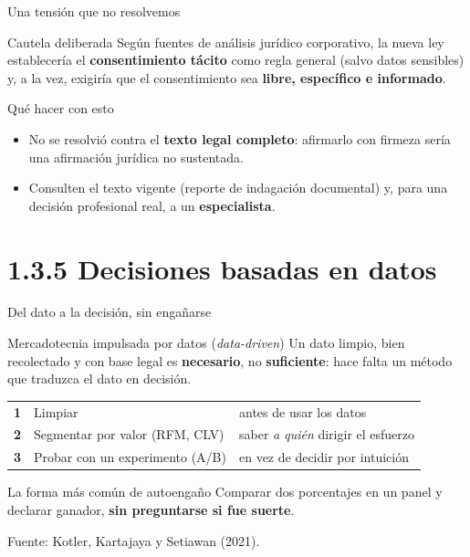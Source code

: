 \documentclass[aspectratio=169,xcolor=dvipsnames]{beamer}
\newcommand{\fuente}[1]{{\tiny\color{IPNgris}Fuente: #1}}
\begin{document}
\begin{frame}{Una tensión que no resolvemos}
\begin{alertblock}{Cautela deliberada}
  \small Según fuentes de análisis jurídico corporativo, la nueva ley establecería el \textbf{consentimiento tácito} como regla general (salvo datos sensibles) y, a la vez, exigiría que el consentimiento sea \textbf{libre, específico e informado}.
\end{alertblock}
\begin{block}{Qué hacer con esto}
  \small
  \begin{itemize}
    \item No se resolvió contra el \textbf{texto legal completo}: afirmarlo con firmeza sería una afirmación jurídica no sustentada.
    \item Consulten el texto vigente (reporte de indagación documental) y, para una decisión profesional real, a un \textbf{especialista}.
  \end{itemize}
\end{block}
\end{frame}

\section[Decisión]{1.3.5 Decisiones basadas en datos}

\begin{frame}{Del dato a la decisión, sin engañarse}
\begin{block}{Mercadotecnia impulsada por datos (\textit{data-driven})}
  \small Un dato limpio, bien recolectado y con base legal es \textbf{necesario}, no \textbf{suficiente}: hace falta un método que traduzca el dato en decisión.
\end{block}
\begin{center}
\begin{tabular}{@{}clp{6.4cm}@{}}
  \textbf{1} & Limpiar & antes de usar los datos \\
  \textbf{2} & Segmentar por valor (RFM, CLV) & saber \emph{a quién} dirigir el esfuerzo \\
  \textbf{3} & Probar con un experimento (A/B) & en vez de decidir por intuición \\
\end{tabular}
\end{center}
\begin{alertblock}{La forma más común de autoengaño}
  Comparar dos porcentajes en un panel y declarar ganador, \textbf{sin preguntarse si fue suerte}.
\end{alertblock}
\fuente{Kotler, Kartajaya y Setiawan (2021).}
\end{frame}
\end{document}
